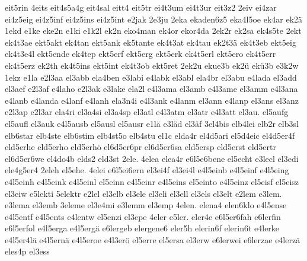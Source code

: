 {    eit5rin
    4eits
    eit4s5a4g
    eit4sal
    eitt4
    eit5tr
    ei4t3um
    ei4t3ur
    eit3z2
    2eiv
    ei4zar
    ei4z5eig
    ei4z5inf
    ei4z5ins
    ei4z5int
    e2jak
    2e3ju
    2eka
    ekaden6z5
    eka4l5oe
    ek4ar
    ek2ä
    1ekd
    e1ke
    eke2n
    e1ki
    e1k2l
    ek2n
    eko4man
    ek4or
    ekor4da
    2ek2r
    ek2sa
    ek4s5te
    2ekt
    ek4t3ae
    ekt5akt
    ek4tan
    ekt5ank
    ek5tante
    ek4t3at
    ek4tau
    ek2t3ä
    ek4t3eb
    ekt5eig
    ek4t3e4l
    ekt5ende
    ek4tep
    ekt5erf
    ekt5erg
    ekt5erk
    ek4t5erl
    ekt5ero
    ek4t5err
    ek4t5erz
    ek2th
    ek4t5ins
    ekt5int
    ek4t3ob
    ekt5ret
    2ek2u
    ekue3b
    ek2ü
    ekü3b
    e3k2w
    1ekz
    e1la
    e2l3aa
    el3abb
    ela4ben
    e3labi
    e4labk
    el3abl
    ela4br
    el3abu
    e4lada
    el3add
    el3aef
    e2l3af
    e4laho
    e2l3ak
    e3lake
    ela2l
    e4l3ama
    el3amb
    e4l3ame
    el3amm
    e4l3ana
    e4lanb
    e4landa
    e4lanf
    e4lanh
    ela3n4i
    e4l3ank
    e4lanm
    el3ann
    e4lanp
    el3ans
    el3anz
    e2l3ap
    e2l3ar
    ela4ri
    el3a4si
    el3a4sp
    el3atl
    e4l3atm
    el3atr
    e4l3att
    el3au.
    el5aufg
    el5aufl
    el3auk
    e4l5ausb
    el5ausl
    el5ausr
    e1lä
    e3läd
    el3äf
    3el4bis
    elb4lei
    elb2r
    elb3sl
    elb6star
    elb4ste
    elb6stim
    elb4st5o
    elb4stu
    el1c
    elda4r
    el4d5ari
    el5d4eic
    el4d5er4f
    eld5erhe
    eld5erho
    eld5erhö
    el6d5er6pr
    el6d5er6sa
    eld5ersp
    eld5erst
    eld5ertr
    el6d5er6we
    el4do4b
    elds2
    eld3st
    2ele.
    4elea
    elea4r
    e6l5e6bene
    el5echt
    e3lecl
    el3edi
    ele4g5er4
    2eleh
    el5ehe.
    4elei
    e6l5ei6ern
    el3ei4f
    el3ei4l
    e4l5einb
    e4l5einf
    e4l5eing
    e4l5einh
    e4l5eink
    e4l5einl
    el5einn
    e4l5einr
    e4l5eins
    el5einto
    e4l5einz
    el5eisf
    el5eisz
    el3eiw
    e5lekti
    5elektr
    e2lel
    el3elb
    el3ele
    el3eli
    el3ell
    el3els
    el3elt
    e2lem
    e3lem.
    e3lema
    el3emb
    3eleme
    el3e4mi
    e3lemm
    el3emp
    4elen.
    elena4
    elen6klo
    e4l5ense
    e4l5entf
    e4l5ents
    e4lentw
    el5enzi
    el3epe
    4eler
    e5ler.
    eler4e
    e6l5er6fah
    e6lerfin
    e6l5erfol
    e4l5erga
    e4l5ergä
    e6lergeb
    elergene6
    eler5h
    elerin6f
    elerin6t
    e4lerke
    e4l5er4lä
    e4l5ernä
    e4l5eroe
    e4l3erö
    el5erre
    el5ersa
    el3erw
    e6lerwei
    e6lerzae
    e4lerzä
    eles4p
    el3ess
}
